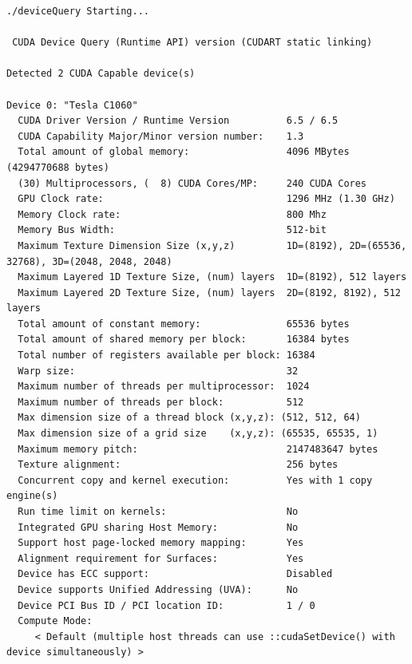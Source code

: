 \begin{Verbatim}[fontsize=\footnotesize,breaklines,breakanywhere,xleftmargin=4pt]
./deviceQuery Starting...

 CUDA Device Query (Runtime API) version (CUDART static linking)

Detected 2 CUDA Capable device(s)

Device 0: "Tesla C1060"
  CUDA Driver Version / Runtime Version          6.5 / 6.5
  CUDA Capability Major/Minor version number:    1.3
  Total amount of global memory:                 4096 MBytes (4294770688 bytes)
  (30) Multiprocessors, (  8) CUDA Cores/MP:     240 CUDA Cores
  GPU Clock rate:                                1296 MHz (1.30 GHz)
  Memory Clock rate:                             800 Mhz
  Memory Bus Width:                              512-bit
  Maximum Texture Dimension Size (x,y,z)         1D=(8192), 2D=(65536, 32768), 3D=(2048, 2048, 2048)
  Maximum Layered 1D Texture Size, (num) layers  1D=(8192), 512 layers
  Maximum Layered 2D Texture Size, (num) layers  2D=(8192, 8192), 512 layers
  Total amount of constant memory:               65536 bytes
  Total amount of shared memory per block:       16384 bytes
  Total number of registers available per block: 16384
  Warp size:                                     32
  Maximum number of threads per multiprocessor:  1024
  Maximum number of threads per block:           512
  Max dimension size of a thread block (x,y,z): (512, 512, 64)
  Max dimension size of a grid size    (x,y,z): (65535, 65535, 1)
  Maximum memory pitch:                          2147483647 bytes
  Texture alignment:                             256 bytes
  Concurrent copy and kernel execution:          Yes with 1 copy engine(s)
  Run time limit on kernels:                     No
  Integrated GPU sharing Host Memory:            No
  Support host page-locked memory mapping:       Yes
  Alignment requirement for Surfaces:            Yes
  Device has ECC support:                        Disabled
  Device supports Unified Addressing (UVA):      No
  Device PCI Bus ID / PCI location ID:           1 / 0
  Compute Mode:
     < Default (multiple host threads can use ::cudaSetDevice() with device simultaneously) >


\end{Verbatim}
